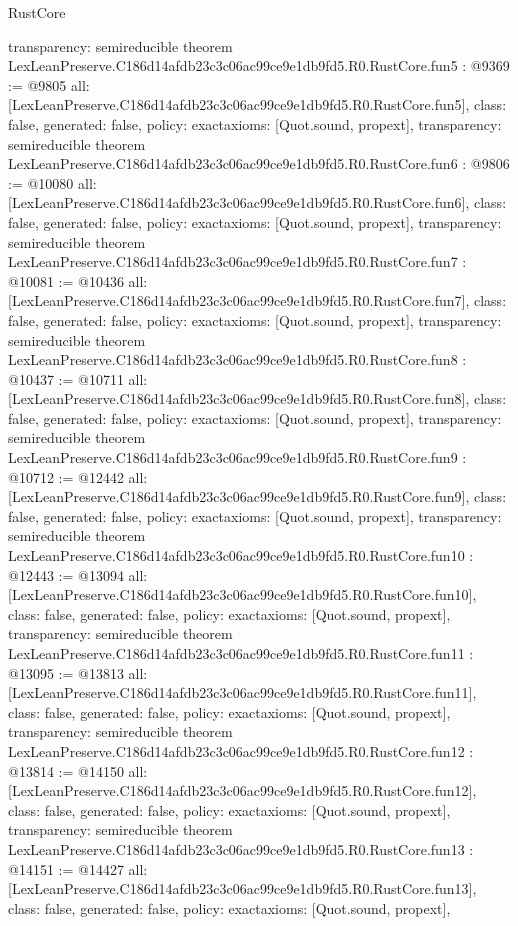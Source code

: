 \begin{lexlean}{RustCore}
\begin{coremodule}
{  transparency: semireducible
}
theorem LexLeanPreserve.C186d14afdb23c3c06ac99ce9e1db9fd5.R0.RustCore.fun5 : @9369 := @9805 {
  all: [LexLeanPreserve.C186d14afdb23c3c06ac99ce9e1db9fd5.R0.RustCore.fun5],
  class: false,
  generated: false,
  policy: exact{axioms: [Quot.sound, propext]},
  transparency: semireducible
}
theorem LexLeanPreserve.C186d14afdb23c3c06ac99ce9e1db9fd5.R0.RustCore.fun6 : @9806 := @10080 {
  all: [LexLeanPreserve.C186d14afdb23c3c06ac99ce9e1db9fd5.R0.RustCore.fun6],
  class: false,
  generated: false,
  policy: exact{axioms: [Quot.sound, propext]},
  transparency: semireducible
}
theorem LexLeanPreserve.C186d14afdb23c3c06ac99ce9e1db9fd5.R0.RustCore.fun7 : @10081 := @10436 {
  all: [LexLeanPreserve.C186d14afdb23c3c06ac99ce9e1db9fd5.R0.RustCore.fun7],
  class: false,
  generated: false,
  policy: exact{axioms: [Quot.sound, propext]},
  transparency: semireducible
}
theorem LexLeanPreserve.C186d14afdb23c3c06ac99ce9e1db9fd5.R0.RustCore.fun8 : @10437 := @10711 {
  all: [LexLeanPreserve.C186d14afdb23c3c06ac99ce9e1db9fd5.R0.RustCore.fun8],
  class: false,
  generated: false,
  policy: exact{axioms: [Quot.sound, propext]},
  transparency: semireducible
}
theorem LexLeanPreserve.C186d14afdb23c3c06ac99ce9e1db9fd5.R0.RustCore.fun9 : @10712 := @12442 {
  all: [LexLeanPreserve.C186d14afdb23c3c06ac99ce9e1db9fd5.R0.RustCore.fun9],
  class: false,
  generated: false,
  policy: exact{axioms: [Quot.sound, propext]},
  transparency: semireducible
}
theorem LexLeanPreserve.C186d14afdb23c3c06ac99ce9e1db9fd5.R0.RustCore.fun10 : @12443 := @13094 {
  all: [LexLeanPreserve.C186d14afdb23c3c06ac99ce9e1db9fd5.R0.RustCore.fun10],
  class: false,
  generated: false,
  policy: exact{axioms: [Quot.sound, propext]},
  transparency: semireducible
}
theorem LexLeanPreserve.C186d14afdb23c3c06ac99ce9e1db9fd5.R0.RustCore.fun11 : @13095 := @13813 {
  all: [LexLeanPreserve.C186d14afdb23c3c06ac99ce9e1db9fd5.R0.RustCore.fun11],
  class: false,
  generated: false,
  policy: exact{axioms: [Quot.sound, propext]},
  transparency: semireducible
}
theorem LexLeanPreserve.C186d14afdb23c3c06ac99ce9e1db9fd5.R0.RustCore.fun12 : @13814 := @14150 {
  all: [LexLeanPreserve.C186d14afdb23c3c06ac99ce9e1db9fd5.R0.RustCore.fun12],
  class: false,
  generated: false,
  policy: exact{axioms: [Quot.sound, propext]},
  transparency: semireducible
}
theorem LexLeanPreserve.C186d14afdb23c3c06ac99ce9e1db9fd5.R0.RustCore.fun13 : @14151 := @14427 {
  all: [LexLeanPreserve.C186d14afdb23c3c06ac99ce9e1db9fd5.R0.RustCore.fun13],
  class: false,
  generated: false,
  policy: exact{axioms: [Quot.sound, propext]},
}
\end{coremodule}
\end{lexlean}
